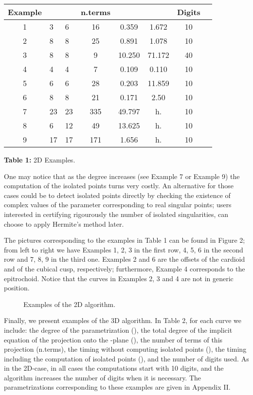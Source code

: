 \documentclass{elsart}
\begin{document}
\begin{center}
\begin{tabular}{|c|l|l|c|c|c|c|c|} \hline
Example &  &  & n.terms  &  &  & Digits  \\
\hline \hline 1 & 3 & 6 & 16  & 0.359 & 1.672 & 10  \\
\hline 2 & 8 & 8 & 25  & 0.891 & 1.078 & 10  \\
\hline 3 & 8 & 8 & 9  & 10.250 & 71.172 & 40  \\
\hline 4 & 4 & 4 & 7  & 0.109 & 0.110 & 10 \\
\hline 5 & 6 & 6 & 28  & 0.203 & 11.859 & 10 \\
\hline 6 & 8 & 8 & 21  & 0.171 & 2.50 & 10 \\
\hline 7 & 23 & 23 & 335  & 49.797 &  h. & 10 \\
\hline 8 & 6 & 12 & 49  & 13.625 &  h. & 10 \\
\hline 9 & 17 & 17 & 171  & 1.656 &  h. & 10 \\
\hline
\end{tabular}

{\bf Table 1:} 2D Examples.
\end{center}


One may notice that as the degree increases (see Example 7 or
Example 9) the computation of the isolated points turns very
costly. An alternative for those cases could be to detect isolated
points directly by checking the existence of complex values of the
parameter corresponding to real singular points; users interested in certifying
rigourously the number of isolated singularities, can choose to apply
Hermite's method later.

The pictures corresponding to the examples in Table 1 can be found
in Figure 2; from left to right we have Examples 1, 2, 3 in the
first row, 4, 5, 6 in the second row and 7, 8, 9 in the third one.
Examples 2 and 6 are the offsets of the cardioid and of the
cubical cusp, respectively; furthermore, Example 4 corresponds to
the epitrochoid. Notice that the curves in Examples 2, 3 and 4 are
not
in generic position.


\begin{figure}[ht]
\begin{center}
\centerline{}
\end{center}
\caption{Examples of the 2D algorithm.}
\end{figure}


Finally, we present examples of the 3D algorithm. In Table 2, for each curve we include: the degree of the
parametrization (), the total degree of the implicit equation
of the projection onto the -plane (), the number of terms
of this projection (n.terms), the timing without computing
isolated points (), the timing including the
computation of isolated points (), and the number of digits
used. As in the 2D-case, in all cases the computations start with
10 digits, and the algorithm increases the number of digits when
it is necessary. The parametrizations corresponding to these
examples are given in Appendix II.
\end{document}
